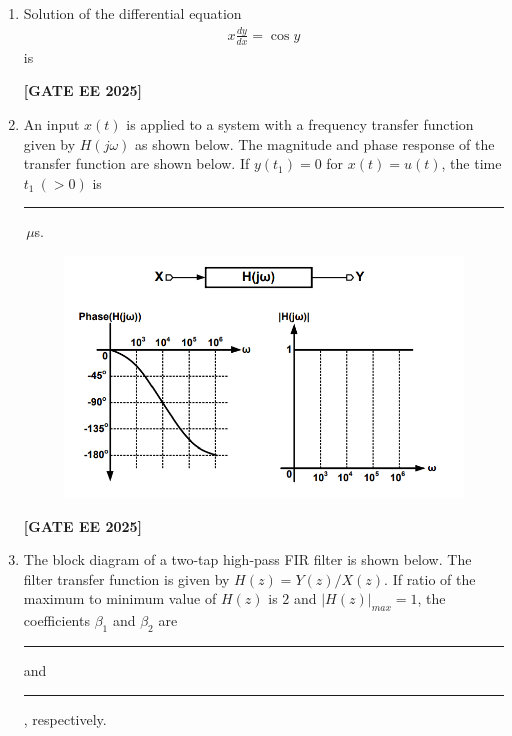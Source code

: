 \documentclass[journal]{IEEEtran}
\newcommand{\qfooter}{%
  \begin{flushright}\footnotesize\textbf{[GATE EE 2025]}\end{flushright}\vspace{1em}%
}
\begin{document}
\begin{enumerate}
\item Solution of the differential equation
\begin{align}
x \frac{dy}{dx} = \cos y
\end{align}
is

\begin{enumerate}
\end{enumerate}
\qfooter

\item An input $x(t)$ is applied to a system with a frequency transfer function given by $H(j\omega)$ as shown below. The magnitude and phase response of the transfer function are shown below. If $y(t_1) = 0$ for $x(t) = u(t)$, the time $t_1\ (>0)$ is \rule{2cm}{0.15mm}\,$\mu$s.

\begin{figure}[h]
\centering
\includegraphics[width=0.5\columnwidth]{figs/q38.png}
\end{figure}

\begin{enumerate}
\qfooter
\end{enumerate}


\item The block diagram of a two-tap high-pass FIR filter is shown below. The filter transfer function is given by $H(z) = Y(z)/X(z)$.  
If ratio of the maximum to minimum value of $H(z)$ is $2$ and $|H(z)|_{max}= 1$, the coefficients $\beta_1$ and $\beta_2$ are \rule{1.2cm}{0.15mm} and \rule{1.2cm}{0.15mm}, respectively.


\end{enumerate}
\end{document}
